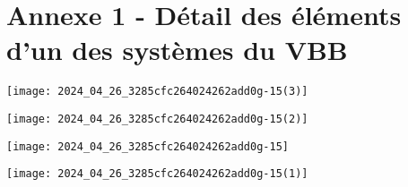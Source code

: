 
\section*{Annexe 1 - Détail des éléments d'un des systèmes du VBB}
\begin{multicols}{2}
\begin{center}
\texttt{[image: 2024\_04\_26\_3285cfc264024262add0g-15(3)]}
\end{center}
\begin{center}
\texttt{[image: 2024\_04\_26\_3285cfc264024262add0g-15(2)]}
\end{center}
\end{multicols}

\begin{multicols}{2}
\begin{center}
\texttt{[image: 2024\_04\_26\_3285cfc264024262add0g-15]}
\end{center}
\begin{center}
\texttt{[image: 2024\_04\_26\_3285cfc264024262add0g-15(1)]}
\end{center}
\end{multicols}
%
%
%
%
%
%


